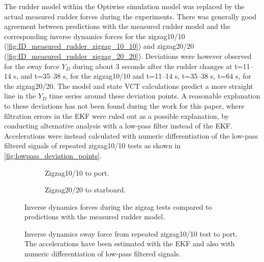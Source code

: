 The rudder model within the Optiwise simulation model was replaced by the actual measured rudder forces during the experiments. There was generally good agreement between predictions with the measured rudder model and the corresponding inverse dynamics forces for the zigzag10/10 (\autoref{fig:ID_measured_rudder_zigzag_10_10}) and zigzag20/20 (\autoref{fig:ID_measured_rudder_zigzag_20_20}).
Deviations were however observed for the sway force $Y_D$ during about 3 seconds after the rudder changes at t=11--14 s, and t=35--38 s, for the zigzag10/10 and t=11--14 s, t=35--38 s, t=64 s, for the zigzag20/20. The model and state VCT calculations predict a more straight line in the $Y_D$ time series around these deviation points. 
A reasonable explanation to these deviations has not been found during the work for this paper, where filtration errors in the EKF were ruled out as a possible explanation, by conducting alternative analysis with a low-pass filter instead of the EKF. Accelerations were instead calculated with numeric differentiation of the low-pass filtered signals of repeated zigzag10/10 tests as shown in \autoref{fig:lowpass_deviation_points}.
\begin{figure}[h]
    \centering
    \begin{subfigure}[b]{\textwidth}
        \centering
        
        \caption{Zigzag10/10 to port.}
        \label{fig:ID_measured_rudder_zigzag_10_10}
    \end{subfigure}
     \vfill
    \begin{subfigure}[b]{\textwidth}
        \centering
        
        \caption{Zigzag20/20 to starboard.}
        \label{fig:ID_measured_rudder_zigzag_20_20}
    \end{subfigure}
    \caption{Inverse dynamics forces during the zigzag tests compared to predictions with the measured rudder model.}
    \label{fig:ID_optiwise20}
\end{figure}
\begin{figure}[h]
    \centering
    
    \caption{Inverse dynamics sway force from repeated zigzag10/10 test to port. The accelerations have been estimated with the EKF and also with numeric differentiation of low-pass filtered signals.}
    \label{fig:lowpass_deviation_points}
\end{figure}

